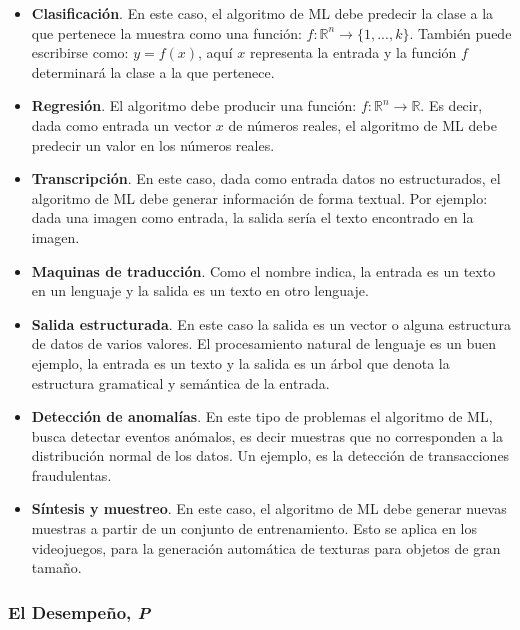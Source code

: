 \begin{itemize}
	\item \textbf{Clasificación}. En este caso, el algoritmo de ML debe predecir la clase a la que pertenece la muestra como una función: $f: \mathbb{R}^n \rightarrow \{ 1, ..., k \}$. También puede escribirse como: $y = f(x)$, aquí $x$ representa la entrada y la función $f$ determinará la clase a la que pertenece.
	
	\item \textbf{Regresión}.  El algoritmo debe producir una función: $f: \mathbb{R}^n \rightarrow \mathbb{R}$. Es decir, dada como entrada un vector $x$ de números reales, el algoritmo de ML debe predecir un valor en los números reales.
	
	\item \textbf{Transcripción}. En este caso, dada como entrada datos no estructurados, el algoritmo de ML debe generar información de forma textual. Por ejemplo: dada una imagen como entrada, la salida sería el texto encontrado en la imagen.
	
	\item \textbf{Maquinas de traducción}. Como el nombre indica, la entrada es un texto en un lenguaje y la salida es un texto en otro lenguaje.
	
	\item \textbf{Salida estructurada}. En este caso la salida es un vector o alguna estructura de datos de varios valores. El procesamiento natural de lenguaje es un buen ejemplo, la entrada es un texto y la salida es un árbol que denota la estructura gramatical y semántica de la entrada.
	
	\item \textbf{Detección de anomalías}. En este tipo de problemas el algoritmo de ML, busca detectar eventos anómalos, es decir muestras que no corresponden a la distribución normal de los datos. Un ejemplo, es la detección de transacciones fraudulentas.
	
	\item \textbf{Síntesis y muestreo}. En este caso, el algoritmo de ML debe generar nuevas muestras a partir de un conjunto de entrenamiento. Esto se aplica en los videojuegos, para la generación automática de texturas para objetos de gran tamaño.
	
	
	

\end{itemize}

\subsubsection{El Desempeño, \textit{P}}


